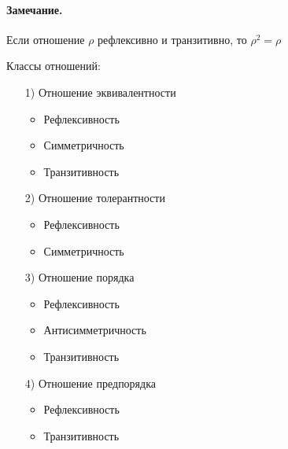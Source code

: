 \paragraph*{Замечание.}
Если отношение $\rho$ рефлексивно и транзитивно, то  $\rho^2  = \rho$


\medskip

Классы отношений:
\begin{itemize}
	\item[1)] Отношение эквивалентности
		\begin{itemize}
			\item Рефлексивность
			\item Симметричность
			\item Транзитивность
		\end{itemize}
	\item[2)] Отношение толерантности
		\begin{itemize}
			\item Рефлексивность
			\item Симметричность
		\end{itemize}
	\item[3)] Отношение порядка
		\begin{itemize}
			\item Рефлексивность
			\item Антисимметричность
			\item Транзитивность
		\end{itemize}
	\item[4)] Отношение предпорядка
		\begin{itemize}
			\item Рефлексивность
			\item Транзитивность
		\end{itemize}
\end{itemize}


